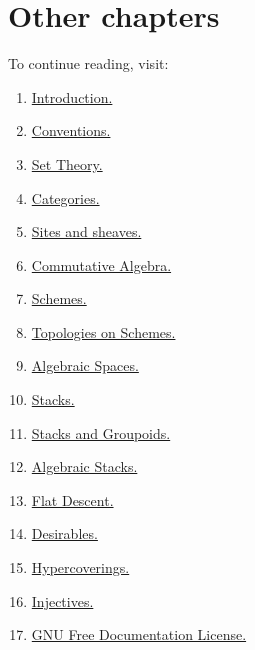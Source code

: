 \section{Other chapters}

\noindent
To continue reading, visit:
\begin{enumerate}
\item \hyperref[introduction-section-overview]{Introduction.}
\item \hyperref[conventions-section-comments]{Conventions.}
\item \hyperref[sets-section-introduction]{Set Theory.}
\item \hyperref[categories-section-introduction]{Categories.}
\item \hyperref[sites-section-introduction]{Sites and sheaves.}
\item \hyperref[algebra-section-introduction]{Commutative Algebra.}
\item \hyperref[schemes-section-introduction]{Schemes.}
\item \hyperref[etale-section-introduction]{Topologies on Schemes.}
\item \hyperref[spaces-section-introduction]{Algebraic Spaces.}
\item \hyperref[stacks-section-introduction]{Stacks.}
\item \hyperref[stacks-groupoids-section-introduction]{Stacks and Groupoids.}
\item \hyperref[algebraic-section-introduction]{Algebraic Stacks.}
\item \hyperref[flat-section-introduction]{Flat Descent.}
\item \hyperref[desirables-section-introduction]{Desirables.}
\item \hyperref[hypercovering-section-introduction]{Hypercoverings.}
\item \hyperref[injectives-section-introduction]{Injectives.}
\item \hyperref[fdl-version]{GNU Free Documentation License.}
\end{enumerate}
